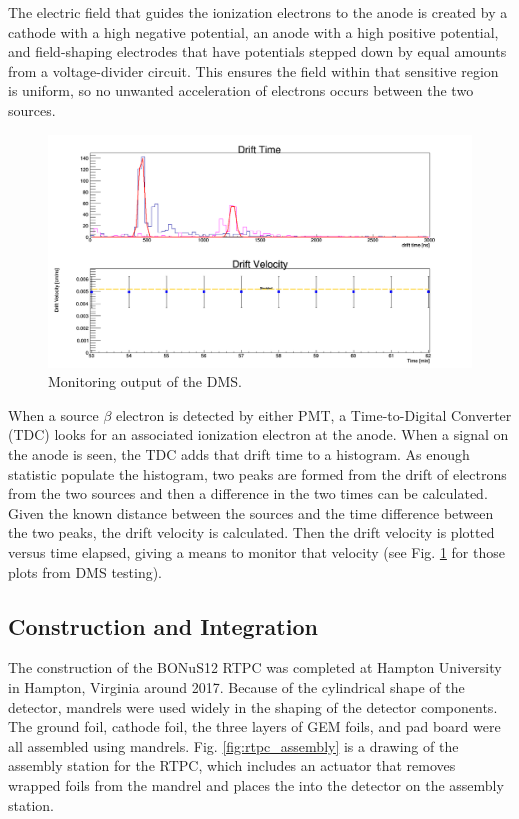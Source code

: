 The electric field that guides the ionization electrons to the anode is created by a cathode with a high negative potential, an anode with a high positive potential, and field-shaping electrodes that have potentials stepped down by equal amounts from a voltage-divider circuit. This ensures the field within that sensitive region is uniform, so no unwanted acceleration of electrons occurs between the two sources.

\begin{figure}[h!]
	\centering
	\includegraphics[width=0.8\linewidth]{figures/dms_gui.png}
	\caption{Monitoring output of the DMS.}
	\label{fig:dms_gui}
\end{figure}

When a source $\beta$ electron is detected by either PMT, a Time-to-Digital Converter (TDC) looks for an associated ionization electron at the anode. When a signal on the anode is seen, the TDC adds that drift time to a histogram. As enough statistic populate the histogram, two peaks are formed from the drift of electrons from the two sources and then a difference in the two times can be calculated. Given the known distance between the sources and the time difference between the two peaks, the drift velocity is calculated. Then the drift velocity is plotted versus time elapsed, giving a means to monitor that velocity (see Fig. \ref{fig:dms_gui} for those plots from DMS testing).

\subsection{Construction and Integration}
The construction of the BONuS12 RTPC was completed at Hampton University in Hampton, Virginia around 2017. Because of the cylindrical shape of the detector, mandrels were used widely in the shaping of the detector components. The ground foil, cathode foil, the three layers of GEM foils, and pad board were all assembled using mandrels. Fig. \ref{fig:rtpc_assembly} is a drawing of the assembly station for the RTPC, which includes an actuator that removes wrapped foils from the mandrel and places the into the detector on the assembly station.

